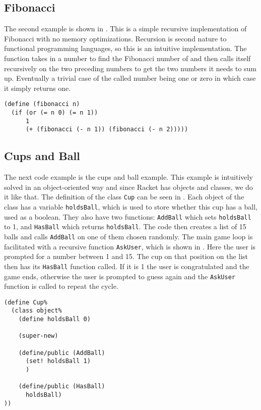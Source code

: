 \subsection{Fibonacci}
The second example is shown in . 
This is a simple recursive implementation of Fibonacci with no memory optimizations.
Recursion is second nature to functional programming languages, so this is an intuitive implementation.
The function takes in a number to find the Fibonacci number of and then calls itself recursively on the two preceding numbers to get the two numbers it needs to sum up.
Eventually a trivial case of the called number being one or zero in which case it simply returns one.

\begin{lstlisting}[caption={The Fibonacci function in DrRacket}, label={DrRacket_fibonacci}]
(define (fibonacci n)
  (if (or (= n 0) (= n 1))
      1
      (+ (fibonacci (- n 1)) (fibonacci (- n 2)))))
\end{lstlisting}

\subsection{Cups and Ball}
The next code example is the cups and ball example.
This example is intuitively solved in an object-oriented way and since Racket has objects and classes, we do it like that.
The definition of the class \lstinline!Cup! can be seen in . Each object of the class has a variable \lstinline!holdsBall!, which is used to store whether this cup has a ball, used as a boolean.
They also have two functions: \lstinline!AddBall! which sets \lstinline!holdsBall! to 1, and \lstinline!HasBall! which returns \lstinline!holdsBall!.
The code then creates a list of 15 balls and calls \lstinline!AddBall! on one of them chosen randomly.
The main game loop is facilitated with a recursive function \lstinline!AskUser!, which is shown in .
Here the user is prompted for a number between 1 and 15.
The cup on that position on the list then has its \lstinline!HasBall! function called.
If it is 1 the user is congratulated and the game ends, otherwise the user is prompted to guess again and the \lstinline!AskUser! function is called to repeat the cycle.

\begin{lstlisting}[caption={The Cup class definition in DrRacket}, label={DrRacket_cup_object}]
(define Cup%
  (class object%
    (define holdsBall 0)

    (super-new)
    
    (define/public (AddBall)
      (set! holdsBall 1)
      )
    
    (define/public (HasBall)
      holdsBall)
))
\end{lstlisting}


